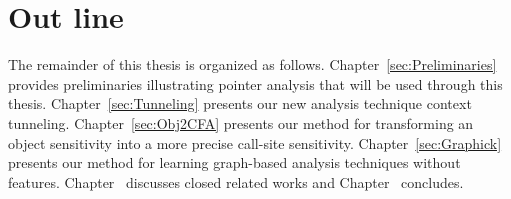 \section{Out line}
The remainder of this thesis is organized as follows.
Chapter~{\ref{sec:Preliminaries}} provides preliminaries illustrating pointer analysis that will be used through this thesis.
Chapter~{\ref{sec:Tunneling}} presents our new analysis technique context tunneling. 
Chapter~{\ref{sec:Obj2CFA}} presents our method for transforming an object sensitivity into a more precise call-site sensitivity.
Chapter~{\ref{sec:Graphick}} presents our method for learning graph-based analysis techniques without features.
Chapter~{} discusses closed related works and
Chapter~{} concludes.
%
%
%
%
%
%
%
%
%





